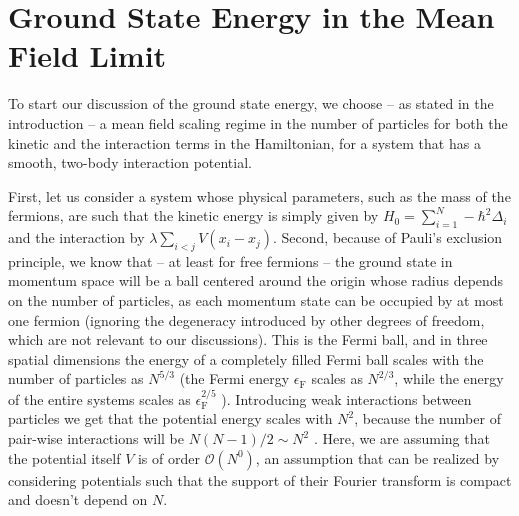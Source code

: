 \chapter{Ground State Energy in the Mean Field Limit}
\label{main-chapter}

To start our discussion of the ground state energy, we choose -- as stated in the introduction
-- a mean field scaling regime in the number of particles for both the kinetic and the
interaction terms in the Hamiltonian, for a system that has a smooth, two-body interaction
potential.

First, let us consider a system whose physical parameters, such as the mass of the fermions,
are such that the kinetic energy is simply given by $H_0 = \sum_{i=1}^N -\hbar^2\Delta_i$ and
the interaction by $\lambda \sum_{i<j} V(x_i-x_j)$. Second, because of Pauli's exclusion
principle, we know that -- at least for free fermions -- the ground state in momentum space
will be a ball centered around the origin whose radius depends on the number of particles, as
each momentum state can be occupied by at most one fermion (ignoring the degeneracy introduced
by other degrees of freedom, which are not relevant to our discussions). This is the Fermi
ball, and in three spatial dimensions the energy of a completely filled Fermi ball scales with
the number of particles as $N^{5/3}$ (the Fermi energy $\epsilon_{\mathrm{F}}$ scales as
$N^{2/3}$, while the energy of the entire systems scales as $\epsilon_{\mathrm{F}}^{2/5}$
\cite[p.~132]{ManBook}).
Introducing weak interactions between particles we get that the potential energy scales with
$N^2$, because the number of pair-wise interactions will be $N(N-1)/2 \sim N^2$ \cite{BenArt}.
Here, we are assuming that the potential itself $V$ is of order $\mathcal{O}(N^0)$\cite{HPRArt},
an assumption that can be realized by considering potentials such that the support of their
Fourier transform is compact and doesn't depend on $N$.

